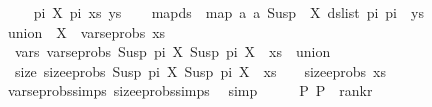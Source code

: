 \begin{isabellebody}
\isanewline
\ \ \isamarkupfalse%
\ {\isacharparenleft}{\kern0pt}{}\ pi{}\ X\ pi{}\ xs\ ys{\isacharparenright}{\kern0pt}\isanewline
\ \ \isamarkupfalse%
\ {\isacharquery}{\kern0pt}mapds\ {\isacharequal}{\kern0pt}\ {\isachardoublequoteopen}map\ {\isacharparenleft}{\kern0pt}{\isasymlambda}a{\isachardot}{\kern0pt}\ {\isacharparenleft}{\kern0pt}a{\isacharcomma}{\kern0pt}\ Susp\ {\isacharbrackleft}{\kern0pt}{\isacharbrackright}{\kern0pt}\ X{\isacharparenright}{\kern0pt}{\isacharparenright}{\kern0pt}\ {\isacharparenleft}{\kern0pt}ds{\isacharunderscore}{\kern0pt}list\ pi{}\ pi{}{\isacharparenright}{\kern0pt}\ {\isacharat}{\kern0pt}\ ys{\isachardoublequoteclose}\isanewline
\ \ \isamarkupfalse%
\ {\isacharquery}{\kern0pt}union\ {\isacharequal}{\kern0pt}\ {\isachardoublequoteopen}{\isacharbraceleft}{\kern0pt}X{\isacharbraceright}{\kern0pt}\ {\isasymunion}\ vars{\isacharunderscore}{\kern0pt}eprobs\ xs{\isachardoublequoteclose}\isanewline
\ \ \isamarkupfalse%
\ {}\ \isamarkupfalse%
\ \isanewline
\ \ vars{\isacharcolon}{\kern0pt}\ {\isachardoublequoteopen}vars{\isacharunderscore}{\kern0pt}eprobs\ {\isacharparenleft}{\kern0pt}{\isacharparenleft}{\kern0pt}Susp\ pi{}\ X{\isacharcomma}{\kern0pt}\ Susp\ pi{}\ X{\isacharparenright}{\kern0pt}\ {\isacharhash}{\kern0pt}\ xs{\isacharparenright}{\kern0pt}\ {\isacharequal}{\kern0pt}\ {\isacharquery}{\kern0pt}union{\isachardoublequoteclose}\ \isanewline
\ \ size{\isacharcolon}{\kern0pt}\ {\isachardoublequoteopen}size{\isacharunderscore}{\kern0pt}eprobs\ {\isacharparenleft}{\kern0pt}{\isacharparenleft}{\kern0pt}Susp\ pi{}\ X{\isacharcomma}{\kern0pt}\ Susp\ pi{}\ X{\isacharparenright}{\kern0pt}\ {\isacharhash}{\kern0pt}\ xs{\isacharparenright}{\kern0pt}\ {\isacharequal}{\kern0pt}\ {}\ {\isacharplus}{\kern0pt}\ size{\isacharunderscore}{\kern0pt}eprobs\ xs{\isachardoublequoteclose}\isanewline
\ \ \ \ \isamarkupfalse%
\ vars{\isacharunderscore}{\kern0pt}eprobs{\isachardot}{\kern0pt}simps\ size{\isacharunderscore}{\kern0pt}eprobs{\isachardot}{\kern0pt}simps\ \isamarkupfalse%
\ simp{\isacharplus}{\kern0pt}\isanewline
\ \ \isamarkupfalse%
\ \isamarkupfalse%
\ {\isachardoublequoteopen}{\isacharparenleft}{\kern0pt}P{}{\isacharcomma}{\kern0pt}\ P{}{\isacharparenright}{\kern0pt}\ {\isasymin}\ rank{\isacharunderscore}{\kern0pt}r{\isachardoublequoteclose}\isanewline

\end{isabellebody}
